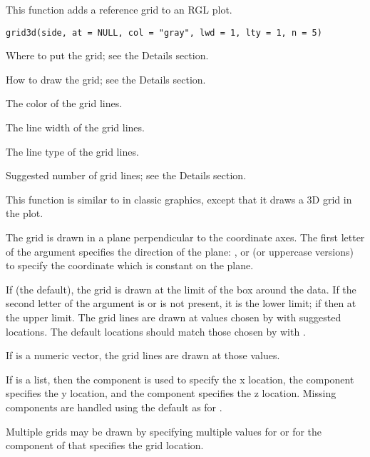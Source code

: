 \begin{Description}\relax
This function adds a reference grid to an RGL plot.
\end{Description}
\begin{Usage}
\begin{verbatim}
grid3d(side, at = NULL, col = "gray", lwd = 1, lty = 1, n = 5)
\end{verbatim}
\end{Usage}
\begin{Arguments}
\begin{ldescription}
\item[\code{side}] Where to put the grid; see the Details section. 
\item[\code{at}] How to draw the grid; see the Details section. 
\item[\code{col}] The color of the grid lines. 
\item[\code{lwd}] The line width of the grid lines. 
\item[\code{lty}] The line type of the grid lines. 
\item[\code{n}] Suggested number of grid lines; see the Details section. 
\end{ldescription}
\end{Arguments}
\begin{Details}\relax
This function is similar to  in classic graphics,
except that it draws a 3D grid in the plot.

The grid is drawn in a plane perpendicular to the coordinate axes. The
first letter of the  argument specifies the direction of
the plane: ,  or  (or uppercase
versions) to specify the coordinate which is constant on the plane.

If  (the default), the grid is drawn at the limit of 
the box around the data.  If the second letter of the  argument
is  or is not present, it is the lower limit; if 
then at the upper limit.  The grid lines are drawn at values
chosen by  with  suggested locations.
The default locations should match those chosen by 
with .

If  is a numeric vector, the grid lines are drawn at those values.

If  is a list, then the  component is used to
specify the x location, the  component specifies the y location, and
the  component specifies the z location.  Missing components
are handled using the default as for .

Multiple grids may be drawn by specifying multiple values for 
or for the component of  that specifies the grid location.
\end{Details}
